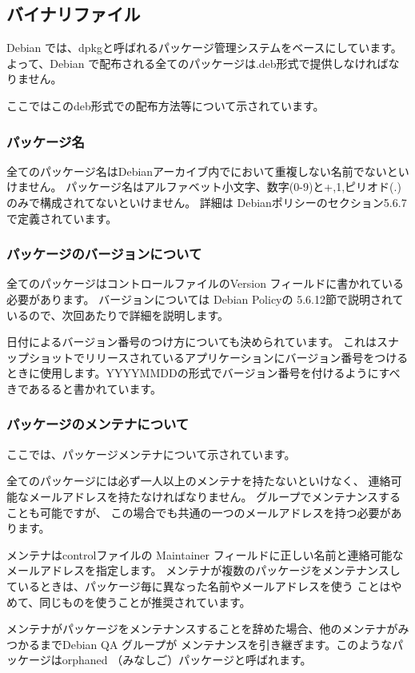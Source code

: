 \documentclass[mingoth,a4paper]{jsarticle}
\begin{document}
\subsection{バイナリファイル}
Debian では、dpkgと呼ばれるパッケージ管理システムをベースにしています。
よって、Debian で配布される全てのパッケージは.deb形式で提供しなければなりません。
	
ここではこのdeb形式での配布方法等について示されています。

\subsubsection{パッケージ名}
全てのパッケージ名はDebianアーカイブ内でにおいて重複しない名前でないといけません。
パッケージ名はアルファベット小文字、数字(0-9)と+,1,ピリオド(.)のみで構成されてないといけません。
詳細は Debianポリシーのセクション5.6.7で定義されています。
		
\subsubsection{パッケージのバージョンについて}
全てのパッケージはコントロールファイルのVersion フィールドに書かれている必要があります。
バージョンについては Debian Policyの 5.6.12節で説明されているので、次回あたりで詳細を説明します。

日付によるバージョン番号のつけ方についても決められています。
これはスナップショットでリリースされているアプリケーションにバージョン番号をつけるときに使用します。YYYYMMDDの形式でバージョン番号を付けるようにすべきであるると書かれています。


\subsubsection{パッケージのメンテナについて}
ここでは、パッケージメンテナについて示されています。
		
全てのパッケージには必ず一人以上のメンテナを持たないといけなく、
連絡可能なメールアドレスを持たなければなりません。
グループでメンテナンスすることも可能ですが、
この場合でも共通の一つのメールアドレスを持つ必要があります。


メンテナはcontrolファイルの Maintainer フィールドに正しい名前と連絡可能なメールアドレスを指定します。
メンテナが複数のパッケージをメンテナンスしているときは、パッケージ毎に異なった名前やメールアドレスを使う
ことはやめて、同じものを使うことが推奨されています。


メンテナがパッケージをメンテナンスすることを辞めた場合、他のメンテナがみつかるまでDebian QA グループが
メンテナンスを引き継ぎます。このようなパッケージはorphaned （みなしご）パッケージと呼ばれます。
\end{document}
